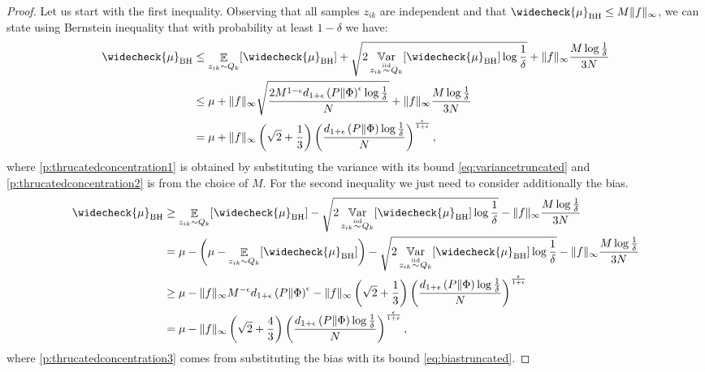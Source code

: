 \thrucatedconcentration*

\begin{proof}
Let us start with the first inequality. Observing that all samples $z_{ik}$ are independent and that $\widecheck{\mu}_{\text{BH}} \le M \|f\|_{\infty}$, we can state using Bernstein inequality \cite{boucheron2013concentration} that with probability at least $1-\delta$ we have:
    \begin{align}
         \widecheck{\mu}_{\text{BH}} & \le \Exp_{z_{ik} \sim Q_k} [\widecheck{\mu}_{\text{BH}}] + \sqrt{2 \Var_{z_{ik} \simiid Q_k}[\widecheck{\mu}_{\text{BH}}] \log \frac{1}{\delta}} +\|f\|_{\infty}  \frac{M  \log \frac{1}{\delta}}{3N} \notag \\
         & \le \mu + \|f\|_{\infty} \sqrt{\frac{2 M^{1-\epsilon} d_{1+\epsilon}\left( P \| \Phi \right)^{\epsilon} \log  \frac{1}{\delta} }{N}} +\|f\|_{\infty} \frac{M \log \frac{1}{\delta}}{3N} \label{p:thrucatedconcentration1}\\
       & = \mu + \|f\|_{\infty}\left(\sqrt{2} + \frac{1}{3} \right)  \left(\frac{d_{1+\epsilon}\left( P \| \Phi  \right) \log  \frac{1}{\delta}  }{N} \right)^{\frac{\epsilon}{1+\epsilon}} \label{p:thrucatedconcentration2},
    \end{align}
    where \eqref{p:thrucatedconcentration1} is obtained by substituting the variance with its bound \eqref{eq:variancetruncated} and \eqref{p:thrucatedconcentration2} is from the choice of $M$.
    For the second inequality we just need to consider additionally the bias.
    \begin{align}
         \widecheck{\mu}_{\text{BH}} & \ge  \Exp_{z_{ik} \sim Q_k} [\widecheck{\mu}_{\text{BH}}] - \sqrt{2 \Var_{z_{ik} \simiid Q_k}[\widecheck{\mu}_{\text{BH}}] \log \frac{1}{\delta}} -\|f\|_{\infty}  \frac{M  \log \frac{1}{\delta}}{3N} \notag\\
         & = \mu - \left(\mu - \Exp_{z_{ik} \sim Q_k} [\widecheck{\mu}_{\text{BH}}] \right) -\sqrt{2 \Var_{z_{ik} \simiid Q_k}[\widecheck{\mu}_{\text{BH}}] \log \frac{1}{\delta}} -\|f\|_{\infty}  \frac{M  \log \frac{1}{\delta}}{3N}  \notag\\
          & \ge \mu - \|f\|_{\infty} M^{-\epsilon} d_{1+\epsilon}\left( P \| \Phi \right)^{\epsilon} - \|f\|_{\infty}\left(\sqrt{2} + \frac{1}{3} \right)  \left(\frac{d_{1+\epsilon}\left( P \| \Phi  \right) \log  \frac{1}{\delta}  }{N} \right)^{\frac{\epsilon}{1+\epsilon}} \label{p:thrucatedconcentration3}\\
          & = \mu - \|f\|_{\infty} \left(\sqrt{2} + \frac{4}{3} \right) \left(\frac{d_{1+\epsilon}\left( P \| \Phi  \right) \log  \frac{1}{\delta}  }{N} \right)^{\frac{\epsilon}{1+\epsilon}}, \notag\\
    \end{align}
    where \eqref{p:thrucatedconcentration3} comes from substituting the bias with its bound \eqref{eq:biastruncated}.
\end{proof}

